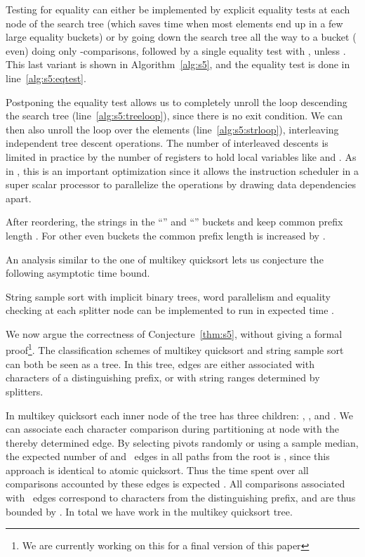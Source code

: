 \documentclass[a4paper]{myjournal}
\begin{document}
Testing for equality can either be implemented by explicit equality tests at
each node of the search tree (which saves time when most elements end up in a
few large equality buckets) or by going down the search tree all the way to a
bucket  ( even) doing only -comparisons, followed by a single
equality test with , unless . This last variant is
shown in Algorithm~\ref{alg:s5}, and the equality test is done in
line~\ref{alg:s5:eqtest}.

Postponing the equality test allows us to completely unroll the loop descending
the search tree (line~\ref{alg:s5:treeloop}), since there is no exit
condition. We can then also unroll the loop over the elements
(line~\ref{alg:s5:strloop}), interleaving independent tree descent
operations. The number of interleaved descents is limited in practice by the
number of registers to hold local variables like  and . As in
\cite{sanders2004super}, this is an important optimization since it allows the
instruction scheduler in a super scalar processor to parallelize the operations
by drawing data dependencies apart.

After reordering, the strings in the ``'' and ``'' buckets
 and  keep common prefix length . For other even buckets
 the common prefix length is increased by .

An analysis similar to the one of multikey quicksort \cite{bentley1997fast} lets
us conjecture the following asymptotic time bound.

\begin{conjecture}\label{thm:s5}
  String sample sort with implicit binary trees, word parallelism and equality
  checking at each splitter node can be implemented to run in expected time
  .
\end{conjecture}

We now argue the correctness of Conjecture~\ref{thm:s5}, without giving a formal
proof\footnote{We are currently working on this for a final version of this
  paper}.  The classification schemes of multikey quicksort and string sample
sort can both be seen as a tree. In this tree, edges are either associated with
characters of a distinguishing prefix, or with string ranges determined by
splitters.

In multikey quicksort each inner node  of the tree has three children: ,
, and . We can associate each character comparison during partitioning at
node  with the thereby determined edge.  By selecting pivots randomly or
using a sample median, the expected number of  and ~edges in all paths
from the root is  \cite{hoare1962quicksort,bentley1997fast}, since
this approach is identical to atomic quicksort. Thus the time spent over all
comparisons accounted by these edges is expected . All
comparisons associated with ~edges correspond to characters from the
distinguishing prefix, and are thus bounded by . In total we have  work in the multikey quicksort tree.
\end{document}
